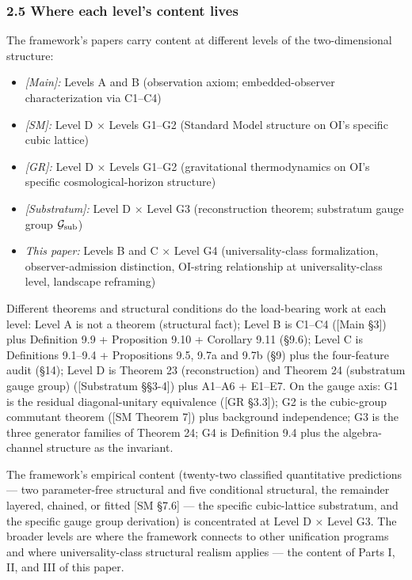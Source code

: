 \documentclass[
]{article}
\providecommand{\tightlist}{%
  \setlength{\itemsep}{0pt}\setlength{\parskip}{0pt}}
\begin{document}
\hypertarget{where-each-levels-content-lives}{%
\subsubsection{2.5 Where each level's content
lives}\label{where-each-levels-content-lives}}

The framework's papers carry content at different levels of the
two-dimensional structure:

\begin{itemize}
\tightlist
\item
  \emph{{[}Main{]}:} Levels A and B (observation axiom;
  embedded-observer characterization via C1--C4)
\item
  \emph{{[}SM{]}:} Level D × Levels G1--G2 (Standard Model structure on
  OI's specific cubic lattice)
\item
  \emph{{[}GR{]}:} Level D × Levels G1--G2 (gravitational thermodynamics
  on OI's specific cosmological-horizon structure)
\item
  \emph{{[}Substratum{]}:} Level D × Level G3 (reconstruction theorem;
  substratum gauge group \(\mathcal{G}_{\rm sub}\))
\item
  \emph{This paper:} Levels B and C × Level G4 (universality-class
  formalization, observer-admission distinction, OI-string relationship
  at universality-class level, landscape reframing)
\end{itemize}

Different theorems and structural conditions do the load-bearing work at
each level: Level A is not a theorem (structural fact); Level B is
C1--C4 ({[}Main §3{]}) plus Definition 9.9 + Proposition 9.10 +
Corollary 9.11 (§9.6); Level C is Definitions 9.1--9.4 + Propositions
9.5, 9.7a and 9.7b (§9) plus the four-feature audit (§14); Level D is
Theorem 23 (reconstruction) and Theorem 24 (substratum gauge group)
({[}Substratum §§3-4{]}) plus A1--A6 + E1--E7. On the gauge axis: G1 is
the residual diagonal-unitary equivalence ({[}GR §3.3{]}); G2 is the
cubic-group commutant theorem ({[}SM Theorem 7{]}) plus background
independence; G3 is the three generator families of Theorem 24; G4 is
Definition 9.4 plus the algebra-channel structure as the invariant.

The framework's empirical content (twenty-two classified quantitative
predictions --- two parameter-free structural and five conditional
structural, the remainder layered, chained, or fitted {[}SM §7.6{]} ---
the specific cubic-lattice substratum, and the specific gauge group
derivation) is concentrated at Level D × Level G3. The broader levels
are where the framework connects to other unification programs and where
universality-class structural realism applies --- the content of Parts
I, II, and III of this paper.
\end{document}
